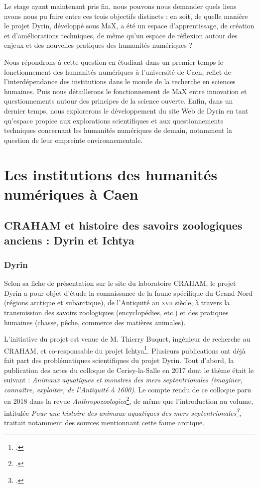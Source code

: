 \documentclass[a4paper,12pt,twoside]{book}
\begin{document}
Le stage ayant maintenant pris fin, nous pouvons nous demander quels liens avons nous pu faire entre ces trois objectifs distincts : en soit, de quelle manière le projet Dyrin, développé sous MaX, a été un espace d'apprentissage, de création et d'améliorations techniques, de même qu'un espace de réflexion autour des enjeux et des nouvelles pratiques des humanités numériques ?

Nous répondrons à cette question en étudiant dans un premier temps le fonctionnement des humanités numériques à l'université de Caen, reflet de l'interdépendance des institutions dans le monde de la recherche en sciences humaines. Puis nous détaillerons le fonctionnement de MaX entre innovation et questionnements autour des principes de la science ouverte. Enfin, dans un dernier temps, nous explorerons le développement du site Web de Dyrin en tant qu'espace propice aux explorations scientifiques et aux questionnements techniques concernant les humanités numériques de demain, notamment la question de leur empreinte environnementale.

	\thispagestyle{empty}
	\cleardoublepage
	
	\mainmatter 
 
 \part{Les institutions des humanités numériques à Caen}
 
\chapter{CRAHAM et histoire des savoirs zoologiques anciens : Dyrin et Ichtya}
    \section{Dyrin}
    Selon sa fiche de présentation sur le site du laboratoire \acrshort{CRAHAM}, le projet Dyrin a pour objet d'étude \og la connaissance de la faune spécifique du Grand Nord (régions arctique et subarctique), de l'Antiquité au \textsc{xvii}\ieme{} siècle, à travers la transmission des savoirs zoologiques (encyclopédies, etc.) et des pratiques humaines (chasse, pêche, commerce des matières animales)\fg.
    
   L'initiative du projet est venue de M. Thierry Buquet, ingénieur de recherche au \acrshort{CRAHAM}, et co-responsable du projet Ichtya\footcite{ichtya}. Plusieurs publications ont déjà fait part des problématiques scientifiques du projet Dyrin. Tout d'abord, la publication des actes du colloque de Cerisy-la-Salle en 2017 dont le thème était le suivant : \og \textit{Animaux aquatiques et monstres des mers septentrionales (imaginer, connaître, exploiter, de l'Antiquité à 1600)}\fg. Le compte rendu de ce colloque paru en 2018 dans la revue \textit{Anthropozoologica}\footcite{aquatique}, de même que l'introduction au volume, intitulée \og \textit{Pour une histoire des animaux aquatiques des mers septentrionales\footcite{natura}}\fg, traitait notamment des sources mentionnant cette faune arctique.
   
\end{document}
